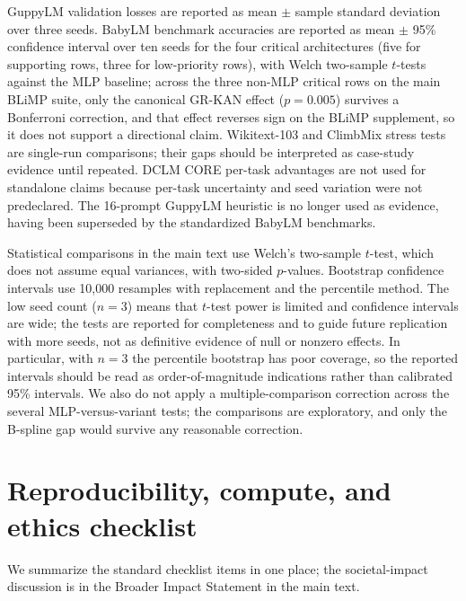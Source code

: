 \documentclass{article}
\newcommand{\modelname}[1]{\textsc{#1}}
\newcommand{\grkan}{\modelname{GR-KAN}}
\begin{document}
GuppyLM validation losses are reported as mean \(\pm\) sample standard deviation over three seeds. BabyLM benchmark accuracies are reported as mean \(\pm\) 95\% confidence interval over ten seeds for the four critical architectures (five for supporting rows, three for low-priority rows), with Welch two-sample \(t\)-tests against the MLP baseline; across the three non-MLP critical rows on the main BLiMP suite, only the canonical \grkan{} effect (\(p=0.005\)) survives a Bonferroni correction, and that effect reverses sign on the BLiMP supplement, so it does not support a directional claim. Wikitext-103 and ClimbMix stress tests are single-run comparisons; their gaps should be interpreted as case-study evidence until repeated. DCLM CORE per-task advantages are not used for standalone claims because per-task uncertainty and seed variation were not predeclared. The 16-prompt GuppyLM heuristic is no longer used as evidence, having been superseded by the standardized BabyLM benchmarks.

Statistical comparisons in the main text use Welch's two-sample \(t\)-test, which does not assume equal variances, with two-sided \(p\)-values. Bootstrap confidence intervals use 10,000 resamples with replacement and the percentile method. The low seed count (\(n=3\)) means that \(t\)-test power is limited and confidence intervals are wide; the tests are reported for completeness and to guide future replication with more seeds, not as definitive evidence of null or nonzero effects. In particular, with \(n=3\) the percentile bootstrap has poor coverage, so the reported intervals should be read as order-of-magnitude indications rather than calibrated 95\% intervals. We also do not apply a multiple-comparison correction across the several MLP-versus-variant tests; the comparisons are exploratory, and only the B-spline gap would survive any reasonable correction.

\section{Reproducibility, compute, and ethics checklist}
\label{app:checklist}

We summarize the standard checklist items in one place; the societal-impact discussion is in the Broader Impact Statement in the main text.
\end{document}
